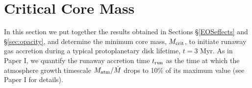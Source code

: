 

\section{Critical Core Mass}
\label{critical}




In this section we put together the results obtained in Sections \S\ref{EOSeffects}  and \S\ref{sec:opacity}, and determine the minimum core mass, $M_{\rm crit}$, to initiate runaway gas accretion during a typical protoplanetary disk lifetime, $t= 3$ Myr. As in Paper I, we quantify the runaway accretion time $t_{\rm run}$ as the time at which the atmosphere growth timescale $M_{\rm atm}/\dot{M}$ drops to 10\% of its maximum value (see Paper I for details). 



